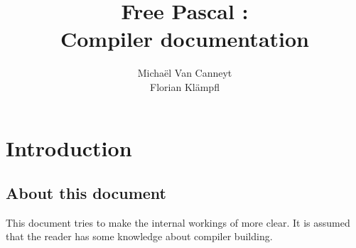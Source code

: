 %
%
%
%
%

\ifpdf
\fi
%
%
\makeindex
%
%

\title{Free Pascal :\\ Compiler documentation}

\author{Micha\"el Van Canneyt\\Florian Kl\"ampfl}
\maketitle
\tableofcontents

\chapter{Introduction}

\section{About this document}

This document tries to make the internal workings of \fpc more clear.
It is assumed that the reader has some knowledge about compiler
building.

